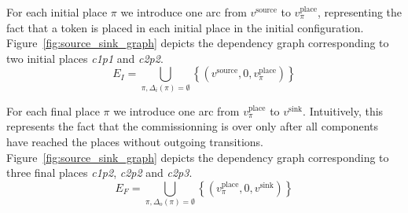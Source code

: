 



For each initial place $\pi$ we introduce one arc from $v^\text{source}$
to $v_\pi^\text{place}$, representing the fact that a token is placed in each
initial place in the initial configuration.
Figure~\ref{fig:source_sink_graph} depicts the dependency graph corresponding to two initial
places \emph{c1p1} and \emph{c2p2}.
\[
E_I=\bigcup_{\pi, \Delta_i(\pi) = \emptyset}\left\{ \left(v^\text{source},0,v_\pi^\text{place}\right)\right\} 
\]

For each final place $\pi$ we introduce one arc from $v_\pi^\text{place}$
to $v^\text{sink}$. Intuitively, this represents the fact that the
commissionning is over only after all components have reached the
places without outgoing transitions.
Figure~\ref{fig:source_sink_graph} depicts the dependency graph
corresponding to three final places \emph{c1p2}, \emph{c2p2}
and \emph{c2p3}.
\[
E_F=\bigcup_{\pi, \Delta_o(\pi) = \emptyset}\left\{ \left(v_\pi^\text{place},0,v^\text{sink}\right)\right\} 
\]

